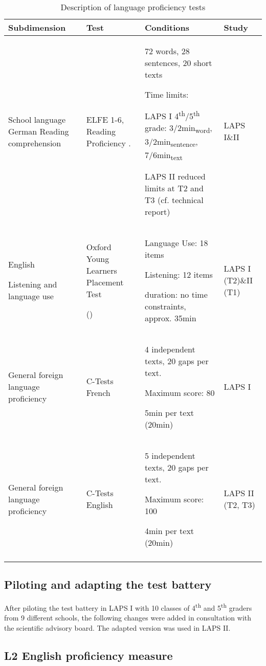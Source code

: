\documentclass[output=paper]{langsci/langscibook}
\begin{document}
\begin{table}\footnotesize
\begin{tabularx}{\textwidth}{QQQl}
\lsptoprule
{Subdimension} & {Test} & {Conditions} & {Study}\\\midrule
School language German Reading comprehension & ELFE 1-6, Reading Proficiency \citealt{LenhardSchneider2006}. & 72 words, 28 sentences, 20 short texts

Time limits:

LAPS I 4\textsuperscript{th}/5\textsuperscript{th} grade: 3/2min\textsubscript{word}, 3/2min\textsubscript{sentence}, 7/6min\textsubscript{text}

LAPS II reduced limits at T2 and T3 (cf. technical report) & LAPS I\&II\\
English 

Listening and language use & Oxford Young Learners Placement Test

(\citealt{Testing2013}) & Language Use: 18 items

Listening: 12 items

duration: no time constraints, approx. 35min & LAPS I (T2)\&II (T1)\\
General foreign language proficiency & C-Tests French & 4 independent texts, 20 gaps per text.

Maximum score: 80

5min per text (20min) & LAPS I\\
General foreign language proficiency & C-Tests English & 5 independent texts, 20 gaps per text.

Maximum score: 100

4min per text (20min) & LAPS II (T2, T3)\\
\lspbottomrule
\end{tabularx}
\caption{Description of language proficiency tests\label{tab:tests:part-4}}
\end{table}

\subsection{Piloting and adapting the test battery}

After piloting the test battery in LAPS I with 10 classes of 4\textsuperscript{th} and 5\textsuperscript{th} graders from 9 different schools, the following changes were added in consultation with the scientific advisory board. The adapted version was used in LAPS II.

\subsection{L2 English proficiency measure}
\end{document}
